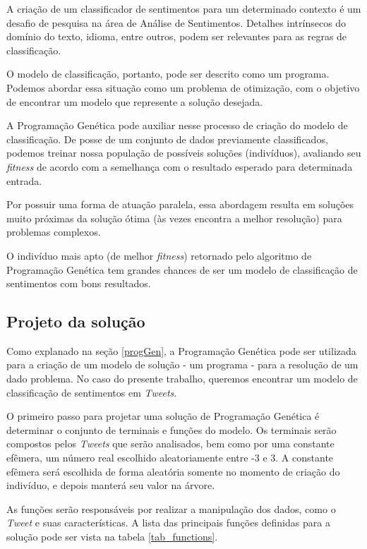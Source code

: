 \documentclass[12pt]{article}
\begin{document}
A criação de um classificador de sentimentos para um determinado contexto é um desafio de pesquisa na área de Análise de Sentimentos. Detalhes intrínsecos do domínio do texto, idioma, entre outros, podem ser relevantes para as regras de classificação. 

O modelo de classificação, portanto, pode ser descrito como um programa. Podemos abordar essa situação como um problema de otimização, com o objetivo de encontrar um modelo que represente a solução desejada.

A Programação Genética pode auxiliar nesse processo de criação do modelo de classificação. De posse de um conjunto de dados previamente classificados, podemos treinar nossa população de possíveis soluções (indivíduos), avaliando seu \emph{fitness} de acordo com a semelhança com o resultado esperado para determinada entrada.

Por possuir uma forma de atuação paralela, essa abordagem resulta em soluções muito próximas da solução ótima (às vezes encontra a melhor resolução) para problemas complexos.

O indivíduo mais apto (de melhor \emph{fitness}) retornado pelo algoritmo de Programação Genética tem grandes chances de ser um modelo de classificação de sentimentos com bons resultados.

\subsection{Projeto da solução}

Como explanado na seção \ref{progGen}, a Programação Genética pode ser utilizada para a criação de um modelo de solução - um programa - para a resolução de um dado problema. No caso do presente trabalho, queremos encontrar um modelo de classificação de sentimentos em \emph{Tweets}.

O primeiro passo para projetar uma solução de Programação Genética é determinar o conjunto de terminais e funções do modelo. Os terminais serão compostos pelos \emph{Tweets} que serão analisados, bem como por uma constante efêmera, um número real escolhido aleatoriamente entre -3 e 3. A constante efêmera será escolhida de forma aleatória somente no momento de criação do indivíduo, e depois manterá seu valor na árvore.

As funções serão responsáveis por realizar a manipulação dos dados, como o \emph{Tweet} e suas características. A lista das principais funções definidas para a solução pode ser vista na tabela \ref{tab_functions}.
\end{document}
